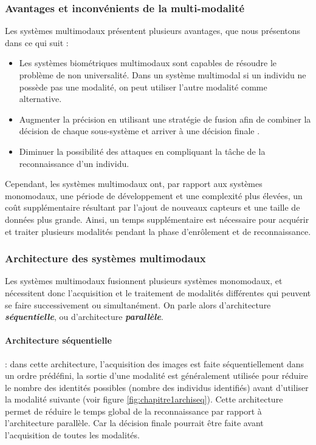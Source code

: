 \subsubsection{Avantages et inconvénients de la multi-modalité }
Les systèmes multimodaux présentent plusieurs avantages, que nous présentons dans ce qui suit :
\begin{itemize}
	\item 	Les systèmes biométriques multimodaux sont capables de résoudre le problème de non universalité. Dans un système multimodal si un individu ne possède pas une modalité, on peut utiliser l’autre modalité comme alternative.
	\item 	Augmenter la précision en utilisant une stratégie de fusion afin de combiner la décision de chaque sous-système et arriver à une décision finale \citep{1_trader_2017}.
	\item 	Diminuer la possibilité des attaques en compliquant la tâche de la reconnaissance d’un individu. 
\end{itemize}	
\vspace{1cm} 
Cependant, les systèmes multimodaux ont, par rapport aux systèmes monomodaux, une période de développement et une complexité plus élevées, un coût supplémentaire résultant par l’ajout de nouveaux capteurs et une taille de données plus grande. Ainsi, un temps supplémentaire est nécessaire pour acquérir et traiter plusieurs modalités pendant la phase d’enrôlement et de reconnaissance. 
\subsubsection{Architecture des systèmes multimodaux}
Les systèmes multimodaux fusionnent plusieurs systèmes monomodaux, et nécessitent donc l'acquisition et le traitement de modalités différentes qui peuvent se faire successivement ou simultanément. On parle alors d’architecture \textbf{\textit{séquentielle}}, ou d'architecture \textbf{\textit{parallèle}}.
\paragraph*{Architecture séquentielle }: dans cette architecture, l'acquisition des images est faite séquentiellement dans un ordre prédéfini, la sortie d'une modalité est généralement utilisée pour réduire le nombre des identités possibles (nombre des individus identifiés) avant d’utiliser la modalité suivante \citep{hong1998integrating} (voir figure \ref{fig:chapitre1archiseq}). Cette architecture permet de réduire le temps global de la reconnaissance par rapport à l'architecture parallèle. Car la décision finale pourrait être faite avant l'acquisition de toutes les modalités. 
	
